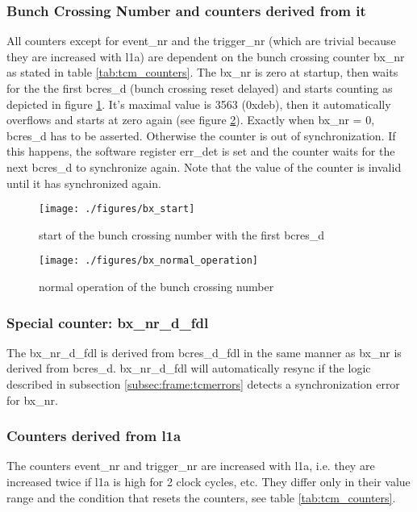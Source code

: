 \subsubsection{Bunch Crossing Number and counters derived from it}
All counters except for event\_nr and the trigger\_nr (which are trivial because they are increased with l1a) are dependent on the bunch crossing counter bx\_nr as stated in table \ref{tab:tcm_counters}. The bx\_nr is zero at startup, then waits for the the first bcres\_d (bunch crossing reset delayed) and starts counting as depicted in figure \ref{fig:bx_start}. It's maximal value is 3563 (0xdeb), then it automatically overflows and starts at zero again (see figure \ref{fig:bx_normal_operation}). Exactly when bx\_nr = 0, bcres\_d has to be asserted. Otherwise the counter is out of synchronization. If this happens, the software register err\_det is set and the counter waits for the next bcres\_d to synchronize again. Note that the value of the counter is invalid until it has synchronized again.

\begin{figure}[ht]
  \texttt{[image: ./figures/bx\_start]}
  \caption{start of the bunch crossing number with the first bcres\_d}
  \label{fig:bx_start}
\end{figure}

\begin{figure}[ht]
  \texttt{[image: ./figures/bx\_normal\_operation]}
  \caption{normal operation of the bunch crossing number}
  \label{fig:bx_normal_operation}
\end{figure}

\subsubsection{Special counter: bx\_nr\_d\_fdl}
The bx\_nr\_d\_fdl is derived from bcres\_d\_fdl in the same manner as bx\_nr is derived from bcres\_d. bx\_nr\_d\_fdl will automatically resync if the logic described in subsection \ref{subsec:frame:tcmerrors} detects a synchronization error for bx\_nr.

\subsubsection{Counters derived from l1a}
The counters event\_nr and trigger\_nr are increased with l1a, i.e. they are increased twice if l1a is high for 2 clock cycles, etc. They differ only in their value range and the condition that resets the counters, see table \ref{tab:tcm_counters}.

